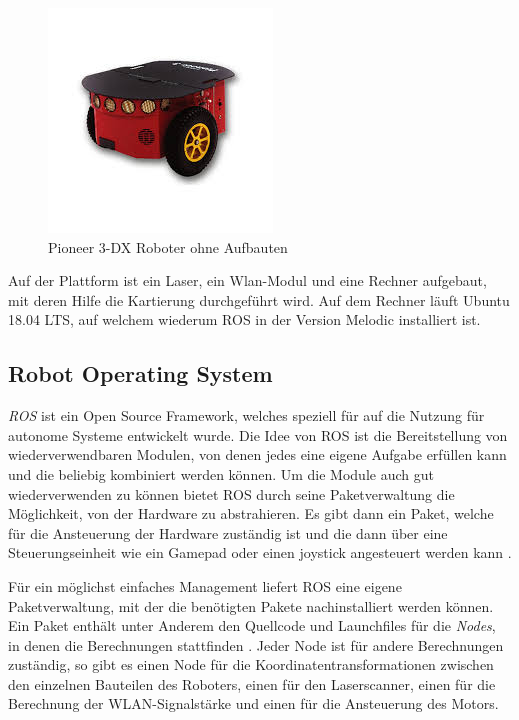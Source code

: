 \documentclass{scrartcl}%
\begin{document}
\begin{figure}[h]
	\centering
	\includegraphics{bilder/pioneerRoh.jpg}
	\caption{Pioneer 3-DX Roboter ohne Aufbauten \cite{pioneer}}
	\label{pioneerRoh}
\end{figure}

Auf der Plattform ist ein Laser, ein Wlan-Modul und eine Rechner aufgebaut, mit deren Hilfe die Kartierung durchgeführt wird. Auf dem Rechner läuft Ubuntu 18.04 LTS, auf welchem wiederum ROS in der Version Melodic installiert ist.

\subsection{Robot Operating System}
\textit{ROS} ist ein Open Source Framework, welches speziell für auf die Nutzung für autonome Systeme entwickelt wurde. Die Idee von ROS ist die Bereitstellung von wiederverwendbaren Modulen, von denen jedes eine eigene Aufgabe erfüllen kann und die beliebig kombiniert werden können. Um die Module auch gut wiederverwenden zu können bietet ROS durch seine Paketverwaltung die Möglichkeit, von der Hardware zu abstrahieren. Es gibt dann ein Paket, welche für die Ansteuerung der Hardware zuständig ist und die dann über eine Steuerungseinheit wie ein Gamepad oder einen joystick angesteuert werden kann \cite{rosIntro}.

Für ein möglichst einfaches Management liefert ROS eine eigene Paketverwaltung, mit der die benötigten Pakete nachinstalliert werden können. Ein Paket enthält unter Anderem den Quellcode und Launchfiles für die \textit{Nodes}, in denen die Berechnungen stattfinden \cite{rosIntro2}. Jeder Node ist für andere Berechnungen zuständig, so gibt es einen Node für die Koordinatentransformationen zwischen den einzelnen Bauteilen des Roboters, einen für den Laserscanner, einen für die Berechnung der WLAN-Signalstärke und einen für die Ansteuerung des Motors.
\end{document}
